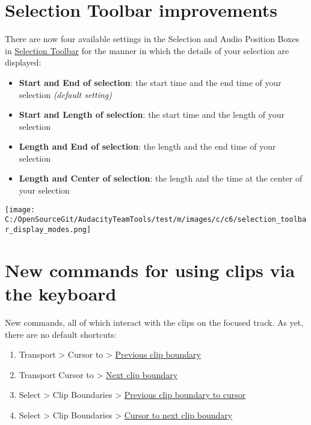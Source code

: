 \begin{multicols}{2}
\section{Selection Toolbar improvements}There are now four available settings in the Selection and Audio Position Boxes in 
\hyperref[XXX\foo{selection_toolbar_}]{Selection Toolbar}
 for the  manner in which the details of your selection are displayed:

\begin{itemize}
\item \textbf{Start and End of selection}: the start time and the end time of your selection \textit{(default setting)}
\item \textbf{Start and Length of selection}: the start time and the length of your selection
\item \textbf{Length and End of selection}: the length and the end time of your selection
\item \textbf{Length and Center of selection}: the length and the time at the center of your selection
\end{itemize}
\par \texttt{[image: C:/OpenSourceGit/AudacityTeamTools/test/m/images/c/c6/selection\_toolbar\_display\_modes.png]}\par 
\section{New commands for using clips via the keyboard}New commands, all of which interact with the clips on the focused track. As yet, there are no default shortcuts:

\begin{enumerate}
\item Transport > Cursor to > 
\hyperref[XXX\foo{transport_menu_cursor_to__previous_clip_boundary}]{Previous clip boundary}

\item Transport Cursor to > 
\hyperref[XXX\foo{transport_menu_cursor_to__next_clip_boundary}]{Next clip boundary}

\item Select > Clip Boundaries > 
\hyperref[XXX\foo{select_menu_clip_boundaries__previous_clip_boundary_to_cursor}]{Previous clip boundary to cursor}

\item Select > Clip Boundaries > 
\hyperref[XXX\foo{select_menu_clip_boundaries__cursor_to_next_clip_boundary}]{Cursor to next clip boundary}


\end{enumerate}
\end{multicols}
